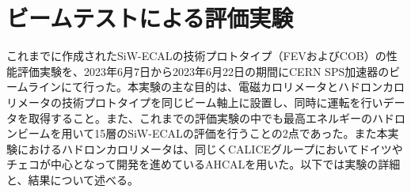 
\chapter{ビームテストによる評価実験} \label{sec:Beamtest}
これまでに作成されたSiW-ECALの技術プロトタイプ（FEVおよびCOB）の性能評価実験を、2023年6月7日から2023年6月22日の期間にCERN SPS加速器のビームラインにて行った。本実験の主な目的は、電磁カロリメータとハドロンカロリメータの技術プロトタイプを同じビーム軸上に設置し、同時に運転を行いデータを取得すること。また、これまでの評価実験の中でも最高エネルギーのハドロンビームを用いて15層のSiW-ECALの評価を行うことの2点であった。また本実験におけるハドロンカロリメータは、同じくCALICEグループにおいてドイツやチェコが中心となって開発を進めているAHCALを用いた。以下では実験の詳細と、結果について述べる。
